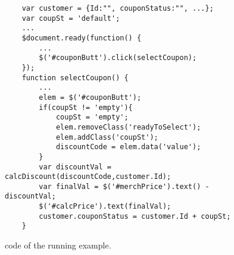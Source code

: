 \begin{figure}
\begin{lstlisting}
	var customer = {Id:"", couponStatus:"", ...};
	var coupSt = 'default';
	...
	$document.ready(function() {
		...
		$('#couponButt').click(selectCoupon);
	});
	function selectCoupon() {
		...
		elem = $('#couponButt');
		if(coupSt != 'empty'){
			coupSt = 'empty';
			elem.removeClass('readyToSelect');
			elem.addClass('coupSt');  
			discountCode = elem.data('value');
		}
		var discountVal = calcDiscount(discountCode,customer.Id);
		var finalVal = $('#merchPrice').text() - discountVal;
		$('#calcPrice').text(finalVal);
		customer.couponStatus = customer.Id + coupSt;  
	}

\end{lstlisting}
\vspace{-0.1in} 

\caption{\javascript code of the running example.}
\label{Fig:example}
\vspace{-0.2in} 

\end{figure}